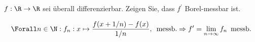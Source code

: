 \begin{exercise}

$f: \R \to \R$ sei überall differenzierbar. Zeigen Sie, dass $f^\prime$ Borel-messbar ist.

\end{exercise}


\begin{solution}

\begin{align*}
  \Forall n \in \N:
  f_n: x \mapsto \frac{f(x + 1/n) - f(x)}{1/n},
  \enspace \text{messb.}
  \Rightarrow
  f^\prime = \lim_{n \to \infty} f_n
  \enspace \text{messb.}
\end{align*}

\end{solution}
